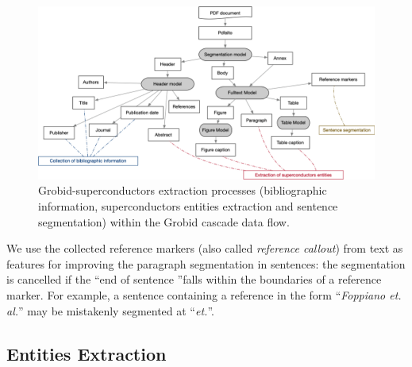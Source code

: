 \documentclass{article}
\begin{document}
\begin{figure}[ht]
\includegraphics[width=\textwidth]{grobid-extraction-2}
\caption{Grobid-superconductors extraction processes (bibliographic information, superconductors entities extraction and sentence segmentation) within the Grobid cascade data flow.}
\label{fig:grobid-document-processing}
\end{figure}

We use the collected reference markers (also called \textit{reference callout}) from text as features for improving the paragraph segmentation in sentences: the segmentation is cancelled if the ``end of sentence ''falls within the boundaries of a reference marker. 
For example, a sentence containing a reference in the form ``\textit{Foppiano et. al.}'' may be mistakenly segmented at ``\textit{et.}''.



\subsection{Entities Extraction}
\label{subsubsec:extraction}
\end{document}
